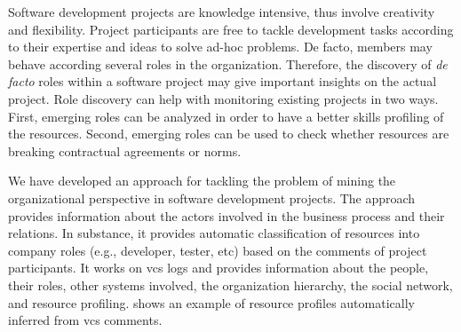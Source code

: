 \documentclass[a4paper,11pt]{article}
\begin{document}
Software development projects are knowledge intensive, thus involve creativity and flexibility. Project participants are free to tackle development tasks according to their expertise and ideas to solve ad-hoc problems. De facto, members may behave according several roles in the organization. Therefore, the discovery of \emph{de facto} roles within a software project may give important insights on the actual project. Role discovery can help with monitoring existing projects in two ways. First, emerging roles can be analyzed in order to have a better skills profiling of the resources. Second, emerging roles can be used to check whether resources are breaking contractual agreements or norms.


We have developed an approach for tackling the problem of mining the organizational perspective in software development projects. The approach provides information about the actors involved in the business process and their relations. In substance, it provides automatic classification of resources into company roles (e.g., developer, tester, etc) based on the comments of project participants. It works on \gls{vcs} logs and provides information about the people, their roles, other systems involved, the organization hierarchy, the social network, and resource profiling.  shows an example of resource profiles automatically inferred from \gls{vcs} comments.
\end{document}
